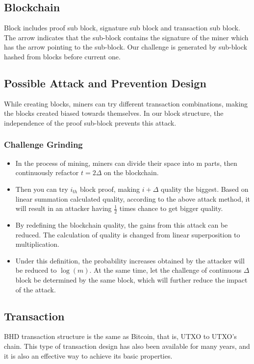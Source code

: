 \subsection{Blockchain}
\begin{flushleft}
    Block includes proof sub block, signature sub block and transaction sub block. The arrow indicates that the sub-block contains the signature of the miner which has the arrow pointing to the sub-block. Our challenge is generated by sub-block hashed from blocks before current one.
\end{flushleft}
\subsection{Possible Attack and Prevention Design}
\begin{flushleft}
    While creating blocks, miners can try different transaction combinations, making the blocks created biased towards themselves. In our block structure, the independence of the proof sub-block prevents this attack.
\end{flushleft}
\subsubsection{Challenge Grinding}
\begin{itemize}
    \item In the process of mining, miners can divide their space into m parts, then continuously refactor $t = 2\Delta$ on the blockchain.
    \item Then you can try $i_{th}$ block proof, making $i + \Delta$ quality the biggest. Based on linear summation calculated quality, according to the above attack method, it will result in an attacker having $\frac{1}{2}$ times chance to get bigger quality.
    \item By redefining the blockchain quality, the gains from this attack can be reduced. The calculation of quality is changed from linear superposition to multiplication.
    \item Under this definition, the probability increases obtained by the attacker will be reduced to $\log(m)$. At the same time, let the challenge of continuous $\Delta$ block be determined by the same block, which will further reduce the impact of the attack.
\end{itemize}
\subsection{Transaction}
\begin{flushleft}
    BHD transaction structure is the same as Bitcoin, that is, UTXO to UTXO's chain. This type of transaction design has also been available for many years, and it is also an effective way to achieve its basic properties.
\end{flushleft}
